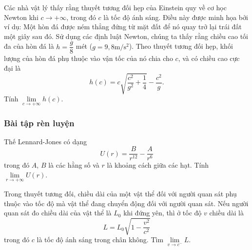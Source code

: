 \begin{vd}%
	Các nhà vật lý  thấy rằng thuyết tương đối hẹp của Einstein quy về cơ học Newton khi $c \rightarrow +\infty$, trong đó $c$ là tốc độ ánh sáng. Điều này được minh họa bởi ví dụ: Một hòn đá được ném thẳng đứng từ mặt đất để nó quay trở lại trái đất một giây sau đó. Sử dụng các định luật Newton, chúng ta thấy rằng chiều cao tối đa của hòn đá là $h=\dfrac{g}{8}$ mét ($g = 9{,}8 \mathrm{m/ s ^2}$). Theo thuyết tương đối hẹp, khối lượng của hòn đá phụ thuộc vào vận tốc của nó chia cho $c$, và có chiều cao cực đại là 
	\[
	h(c)=c \sqrt{\dfrac{c^2}{g^2}+\dfrac{1}{4}}- \dfrac{c^2}{g}.
	\]
	Tính $\lim\limits _{c \rightarrow +\infty} h(c)$.
\end{vd}

\subsubsection{Bài tập rèn luyện}
\begin{bt}%
	Thế Lennard-Jones có dạng $$U(r) = \dfrac{B}{r^{12}} - \dfrac{A}{r^6}$$ trong đó $A$, $B$ là các hằng số và $r$ là khoảng cách giữa các hạt. 
	Tính $\lim\limits _{r \rightarrow +\infty} U(r)$.
\end{bt}

\begin{bt}%
	Trong thuyết tương đối, chiều dài của một vật thể đối với người quan sát phụ thuộc vào tốc độ mà vật thể đang chuyển động đối với người quan sát. Nếu người quan sát đo chiều dài của vật thể là $L_0$ khi đứng yên, thì ở tốc độ $v$ chiều dài  là
	$$
	L=L_0 \sqrt{1-\frac{v^2}{c^2}}
	$$
	trong đó $c$ là tốc độ ánh sáng trong chân không. Tìm $\displaystyle \lim \limits_{v \rightarrow c^{-}} L$. 
\end{bt}


